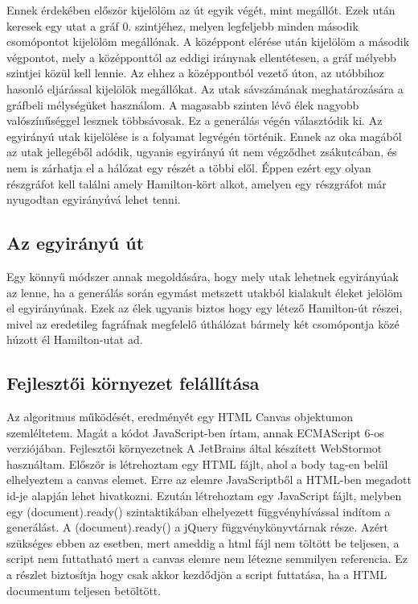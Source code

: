 Ennek érdekében először kijelölöm az út egyik végét, mint megállót. Ezek után keresek egy utat a gráf 0. szintjéhez, melyen legfeljebb minden második csomópontot kijelölöm megállónak. A középpont 
elérése után kijelölöm a második végpontot, mely a középponttól az eddigi iránynak ellentétesen, a gráf mélyebb szintjei közül kell lennie. Az ehhez a középpontból vezető úton, az utóbbihoz hasonló 
eljárással kijelölök megállókat. Az utak sávszámának meghatározására a gráfbeli mélységüket használom. A magasabb szinten lévő élek nagyobb valószínűséggel lesznek többsávosak. Ez a generálás végén választódik
ki. Az egyirányú utak kijelölése is a folyamat legvégén történik. Ennek az oka magából az utak jellegéből adódik, ugyanis egyirányú út nem végződhet zsákutcában, és nem is zárhatja el a hálózat egy részét a többi elől. Éppen ezért egy olyan részgráfot kell találni amely Hamilton-kört alkot, amelyen egy részgráfot már nyugodtan egyirányúvá lehet tenni.
\subsection{Az egyirányú út}
Egy könnyű módszer annak megoldására, hogy mely utak lehetnek egyirányúak az lenne, ha a generálás során egymást metszett utakból kialakult éleket jelölöm el egyirányúnak. Ezek az élek ugyanis biztos hogy egy létező Hamilton-út részei, mivel az eredetileg fagráfnak megfelelő úthálózat bármely két csomópontja közé húzott él Hamilton-utat ad.
\subsection{Fejlesztői környezet felállítása}
Az algoritmus működését, eredményét egy HTML Canvas objektumon szemléltetem. Magát a kódot JavaScript-ben írtam, annak ECMAScript 6-os verziójában. Fejlesztői környezetnek A JetBrains által készített WebStormot használtam. Először is 
létrehoztam egy HTML fájlt, ahol a body tag-en belül elhelyeztem a canvas elemet. Erre az elemre JavaScriptből a HTML-ben megadott id-je alapján lehet hivatkozni. Ezután létrehoztam egy JavaScript fájlt, melyben egy (document).ready() szintaktikában 
elhelyezett függvényhívással indítom a generálást. A (document).ready() a jQuery függvénykönyvtárnak része. Azért szükséges ebben az esetben, mert ameddig a html fájl nem töltött be teljesen, a script nem futtatható mert a canvas elemre nem létezne 
semmilyen referencia. Ez a részlet biztosítja hogy csak akkor kezdődjön a script futtatása, ha a HTML documentum teljesen betöltött. 

